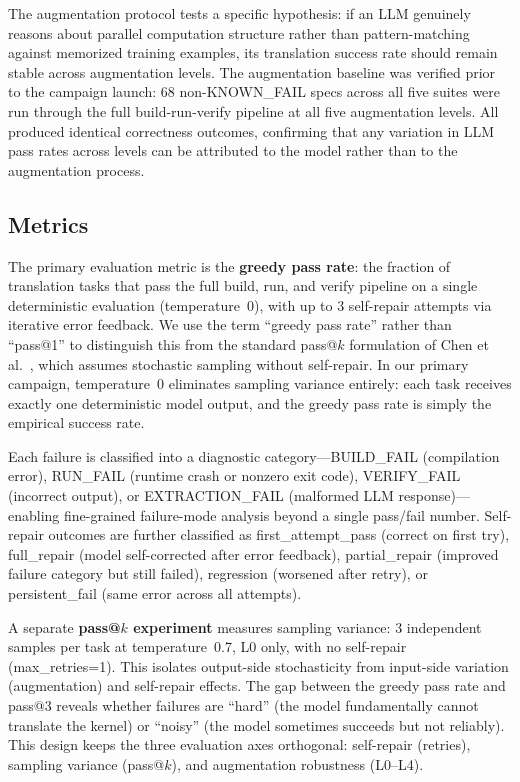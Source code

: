 \documentclass[conference]{IEEEtran}
\begin{document}
The augmentation protocol tests a specific hypothesis: if an LLM genuinely reasons about parallel computation structure rather than pattern-matching against memorized training examples, its translation success rate should remain stable across augmentation levels. The augmentation baseline was verified prior to the campaign launch: 68 non-KNOWN\_FAIL specs across all five suites were run through the full build-run-verify pipeline at all five augmentation levels. All produced identical correctness outcomes, confirming that any variation in LLM pass rates across levels can be attributed to the model rather than to the augmentation process.

\subsection{Metrics}
\label{sec:metrics}

The primary evaluation metric is the \textbf{greedy pass rate}: the fraction of translation tasks that pass the full build, run, and verify pipeline on a single deterministic evaluation (temperature~0), with up to 3 self-repair attempts via iterative error feedback. We use the term ``greedy pass rate'' rather than ``pass@1'' to distinguish this from the standard pass@$k$ formulation of Chen et al.~\cite{HumanEval2021}, which assumes stochastic sampling without self-repair. In our primary campaign, temperature~0 eliminates sampling variance entirely: each task receives exactly one deterministic model output, and the greedy pass rate is simply the empirical success rate.

Each failure is classified into a diagnostic category---BUILD\_FAIL (compilation error), RUN\_FAIL (runtime crash or nonzero exit code), VERIFY\_FAIL (incorrect output), or EXTRACTION\_FAIL (malformed LLM response)---enabling fine-grained failure-mode analysis beyond a single pass/fail number. Self-repair outcomes are further classified as first\_attempt\_pass (correct on first try), full\_repair (model self-corrected after error feedback), partial\_repair (improved failure category but still failed), regression (worsened after retry), or persistent\_fail (same error across all attempts).

A separate \textbf{pass@$k$ experiment} measures sampling variance: 3 independent samples per task at temperature~0.7, L0 only, with no self-repair (max\_retries=1). This isolates output-side stochasticity from input-side variation (augmentation) and self-repair effects. The gap between the greedy pass rate and pass@3 reveals whether failures are ``hard'' (the model fundamentally cannot translate the kernel) or ``noisy'' (the model sometimes succeeds but not reliably). This design keeps the three evaluation axes orthogonal: self-repair (retries), sampling variance (pass@$k$), and augmentation robustness (L0--L4).
\end{document}
